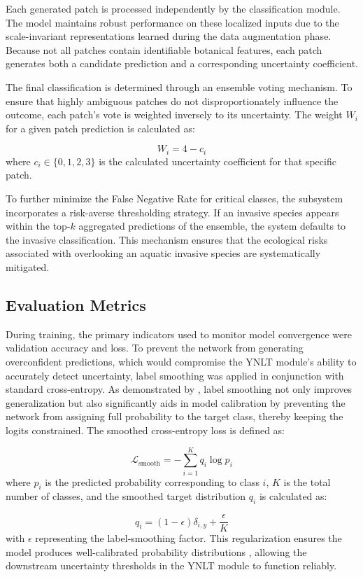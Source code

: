 \documentclass[final,3p,times,twocolumn]{elsarticle}
\begin{document}
Each generated patch is processed independently by the classification module. The model maintains robust performance on these localized inputs due to the scale-invariant representations learned during the data augmentation phase. Because not all patches contain identifiable botanical features, each patch generates both a candidate prediction and a corresponding uncertainty coefficient. 

The final classification is determined through an ensemble voting mechanism. To ensure that highly ambiguous patches do not disproportionately influence the outcome, each patch's vote is weighted inversely to its uncertainty. The weight \( W_i \) for a given patch prediction is calculated as:

\[
W_i = 4 - c_i
\]
where \( c_i \in \{0, 1, 2, 3\} \) is the calculated uncertainty coefficient for that specific patch.

To further minimize the False Negative Rate for critical classes, the subsystem incorporates a risk-averse thresholding strategy. If an invasive species appears within the top-\(k\) aggregated predictions of the ensemble, the system defaults to the invasive classification. This mechanism ensures that the ecological risks associated with overlooking an aquatic invasive species are systematically mitigated.

\subsection{Evaluation Metrics}

During training, the primary indicators used to monitor model convergence were validation accuracy and loss. To prevent the network from generating overconfident predictions, which would compromise the YNLT module's ability to accurately detect uncertainty, label smoothing was applied in conjunction with standard cross-entropy. As demonstrated by \citet{Mulleretal2019}, label smoothing not only improves generalization but also significantly aids in model calibration by preventing the network from assigning full probability to the target class, thereby keeping the logits constrained. The smoothed cross-entropy loss is defined as:

\[
\mathcal{L}_{\text{smooth}} = - \sum_{i=1}^{K} q_i \log p_i
\]
where \( p_i \) is the predicted probability corresponding to class \( i \), \( K \) is the total number of classes, and the smoothed target distribution \( q_i \) is calculated as:

\[
 q_i = (1 - \epsilon) \delta_{i,y} + \frac{\epsilon}{K} 
\]
with \( \epsilon \) representing the label-smoothing factor. This regularization ensures the model produces well-calibrated probability distributions \cite{Guoetal2017, Mulleretal2019}, allowing the downstream uncertainty thresholds in the YNLT module to function reliably.
\end{document}
